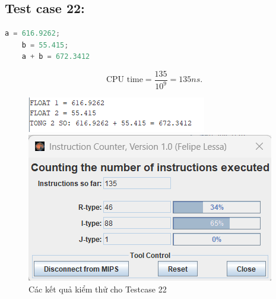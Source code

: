 \subsection{Test case 22:}
\begin{lstlisting}[language=Python]
    a = 616.9262;
    b = 55.415;
    a + b = 672.3412
\end{lstlisting}
\[
\text{CPU time} = \frac{\text{135}}{10^9} = 135 ns.
\]
\begin{figure}[!h]
    \centering
    \begin{minipage}[b]{0.48\textwidth}
        \centering
        \includegraphics[width=\textwidth]{image/TESTCASE/Testcase 22.png}
    \end{minipage}
    \hfill
    \begin{minipage}[b]{0.48\textwidth}
        \centering
        \includegraphics[width=\textwidth]{image/TESTCASE/Instruction Counter 22.png}
    \end{minipage}
    \vspace{0.5cm}
    \caption{Các kết quả kiểm thử cho Testcase 22}
\end{figure}


